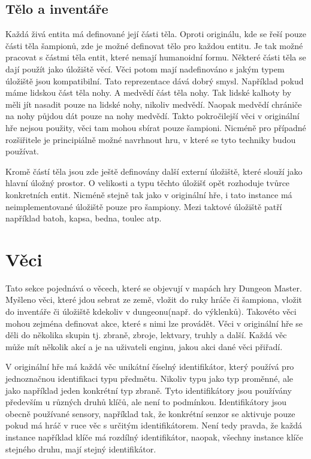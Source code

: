 \subsection{Tělo a inventáře}
Každá živá entita má definované její části těla. Oproti originálu, kde se řeší pouze části těla šampionů,
zde je možné definovat tělo pro každou entitu. Je tak možné pracovat s částmi těla entit, které nemají humanoidní formu.
Některé části těla se dají použít jako úložiště věcí. Věci potom mají nadefinováno s jakým typem úložiště jsou kompatibilní.
Tato reprezentace dává dobrý smysl. Například pokud máme lidskou část těla nohy. A medvědí část těla nohy. Tak lidské
kalhoty by měli jít nasadit pouze na lidské nohy, nikoliv medvědí. Naopak medvědí chrániče na nohy půjdou dát pouze na
nohy medvědí. Takto pokročilejší věci v originální hře nejsou použity, věci tam mohou sbírat pouze šampioni. Nicméně
pro případné rozšiřitele je principiálně možné navrhnout hru, v které se tyto techniky budou používat.

Kromě částí těla jsou zde ještě definovány další externí úložiště, které slouží jako hlavní úložný prostor. O velikosti
a typu těchto úložišť opět rozhoduje tvůrce konkretních entit. Nicméně stejně tak jako v originální hře, i tato instance má neimplementované 
úložiště pouze pro šampiony. Mezi taktové úložiště patří například batoh, kapsa, bedna, toulec atp.

\section{Věci}
Tato sekce pojednává o věcech, které se objevují v mapách hry Dungeon Master. Myšleno věci, které jdou sebrat ze země,
vložit do ruky hráče či šampiona, vložit do inventáře či úložiště kdekoliv v dungeonu(např. do výklenků). Takovéto věci 
mohou zejména definovat akce, které s nimi lze provádět. Věci v originální hře se děli do několika skupin tj. zbraně,
zbroje, lektvary, truhly a další. Každá věc může mít několik akcí a je na uživateli enginu, jakou akci dané věci přiřadí.

V originální hře má každá věc unikátní číselný identifikátor, který používá pro jednoznačnou identifikaci typu předmětu.
Nikoliv typu jako typ proměnné, ale jako například jeden konkrétní typ zbraně. Tyto identifikátory jsou používány především
u různých druhů klíčů, ale není to podmínkou. Identifikátory jsou obecně používané sensory, například tak, že konkrétní senzor
se aktivuje pouze pokud má hráč v ruce věc s určitým identifikátorem. Není tedy pravda, že každá instance například klíče má
rozdílný identifikátor, naopak, všechny instance klíče stejného druhu, mají stejný identifikátor.

